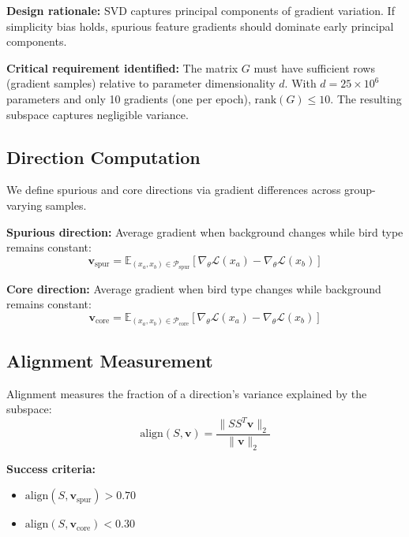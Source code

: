 \textbf{Design rationale:} SVD captures principal components of gradient variation. If simplicity bias holds, spurious feature gradients should dominate early principal components.

\textbf{Critical requirement identified:} The matrix $G$ must have sufficient rows (gradient samples) relative to parameter dimensionality $d$. With $d = 25 \times 10^6$ parameters and only 10 gradients (one per epoch), $\text{rank}(G) \leq 10$. The resulting subspace captures negligible variance.

\subsection{Direction Computation}

We define spurious and core directions via gradient differences across group-varying samples.

\textbf{Spurious direction:} Average gradient when background changes while bird type remains constant:
\begin{equation}
\mathbf{v}_{\text{spur}} = \mathbb{E}_{(x_a, x_b) \in \mathcal{P}_{\text{spur}}} \left[ \nabla_\theta \mathcal{L}(x_a) - \nabla_\theta \mathcal{L}(x_b) \right]
\end{equation}

\textbf{Core direction:} Average gradient when bird type changes while background remains constant:
\begin{equation}
\mathbf{v}_{\text{core}} = \mathbb{E}_{(x_a, x_b) \in \mathcal{P}_{\text{core}}} \left[ \nabla_\theta \mathcal{L}(x_a) - \nabla_\theta \mathcal{L}(x_b) \right]
\end{equation}

\subsection{Alignment Measurement}

Alignment measures the fraction of a direction's variance explained by the subspace:
\begin{equation}
\text{align}(S, \mathbf{v}) = \frac{\| S S^T \mathbf{v} \|_2}{\| \mathbf{v} \|_2}
\end{equation}

\textbf{Success criteria:}
\begin{itemize}
    \item $\text{align}(S, \mathbf{v}_{\text{spur}}) > 0.70$
    \item $\text{align}(S, \mathbf{v}_{\text{core}}) < 0.30$
\end{itemize}
